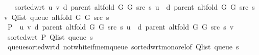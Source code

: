 \begin{isabellebody}
\ \ \ {\isachardoublequoteopen}sorted{\isacharunderscore}{\kern0pt}wrt\ {\isacharparenleft}{\kern0pt}{\isasymlambda}u\ v{\isachardot}{\kern0pt}\ d\ {\isacharparenleft}{\kern0pt}parent\ {\isacharparenleft}{\kern0pt}alt{\isacharunderscore}{\kern0pt}fold\ G{}\ G{}\ src\ s{\isacharparenright}{\kern0pt}{\isacharparenright}{\kern0pt}\ u\ {\isasymle}\ d\ {\isacharparenleft}{\kern0pt}parent\ {\isacharparenleft}{\kern0pt}alt{\isacharunderscore}{\kern0pt}fold\ G{}\ G{}\ src\ s{\isacharparenright}{\kern0pt}{\isacharparenright}{\kern0pt}\ v{\isacharparenright}{\kern0pt}\ {\isacharparenleft}{\kern0pt}Q{\isacharunderscore}{\kern0pt}list\ {\isacharparenleft}{\kern0pt}queue\ {\isacharparenleft}{\kern0pt}alt{\isacharunderscore}{\kern0pt}fold\ G{}\ G{}\ src\ s{\isacharparenright}{\kern0pt}{\isacharparenright}{\kern0pt}{\isacharparenright}{\kern0pt}{\isachardoublequoteclose}\isanewline
%
\isadelimproof
%
\endisadelimproof
%
\isatagproof
{}\isamarkupfalse%
\ {\isacharminus}{\kern0pt}\isanewline
\ \ \isamarkupfalse%
\ {\isacharquery}{\kern0pt}P\ {\isacharequal}{\kern0pt}\ {\isachardoublequoteopen}{\isasymlambda}u\ v{\isachardot}{\kern0pt}\ d\ {\isacharparenleft}{\kern0pt}parent\ {\isacharparenleft}{\kern0pt}alt{\isacharunderscore}{\kern0pt}fold\ G{}\ G{}\ src\ s{\isacharparenright}{\kern0pt}{\isacharparenright}{\kern0pt}\ u\ {\isasymle}\ d\ {\isacharparenleft}{\kern0pt}parent\ {\isacharparenleft}{\kern0pt}alt{\isacharunderscore}{\kern0pt}fold\ G{}\ G{}\ src\ s{\isacharparenright}{\kern0pt}{\isacharparenright}{\kern0pt}\ v{\isachardoublequoteclose}\isanewline
\ \ \isamarkupfalse%
\ {\isachardoublequoteopen}sorted{\isacharunderscore}{\kern0pt}wrt\ {\isacharquery}{\kern0pt}P\ {\isacharparenleft}{\kern0pt}Q{\isacharunderscore}{\kern0pt}list\ {\isacharparenleft}{\kern0pt}queue\ s{\isacharparenright}{\kern0pt}{\isacharparenright}{\kern0pt}{\isachardoublequoteclose}\isanewline
\ \ \ \ \isamarkupfalse%
\ queue{\isacharunderscore}{\kern0pt}sorted{\isacharunderscore}{\kern0pt}wrt{\isacharunderscore}{\kern0pt}d\ not{\isacharunderscore}{\kern0pt}white{\isacharunderscore}{\kern0pt}if{\isacharunderscore}{\kern0pt}mem{\isacharunderscore}{\kern0pt}queue\ sorted{\isacharunderscore}{\kern0pt}wrt{\isacharunderscore}{\kern0pt}mono{\isacharunderscore}{\kern0pt}rel{\isacharbrackleft}{\kern0pt}of\ {\isachardoublequoteopen}{\isacharparenleft}{\kern0pt}Q{\isacharunderscore}{\kern0pt}list\ {\isacharparenleft}{\kern0pt}queue\ s{\isacharparenright}{\kern0pt}{\isacharparenright}{\kern0pt}{\isachardoublequoteclose}{\isacharbrackright}{\kern0pt}\isanewline

\end{isabellebody}
